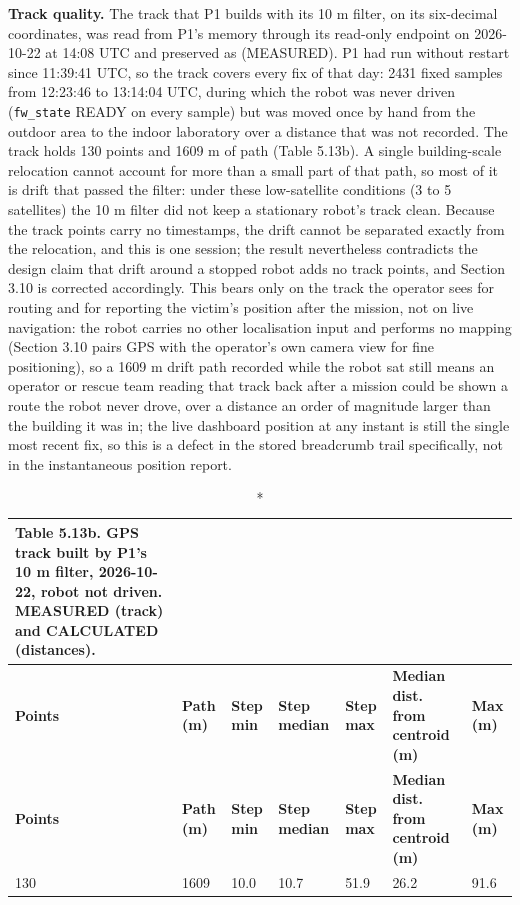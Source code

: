 \textbf{Track quality.} The track that P1 builds with its 10 m filter, on its six-decimal coordinates, was read from P1's memory through its read-only \texttt{} endpoint on 2026-10-22 at 14:08 UTC and preserved as \texttt{} (MEASURED). P1 had run without restart since 11:39:41 UTC, so the track covers every fix of that day: 2431 fixed samples from 12:23:46 to 13:14:04 UTC, during which the robot was never driven (\texttt{fw\_state} READY on every sample) but was moved once by hand from the outdoor area to the indoor laboratory over a distance that was not recorded. The track holds 130 points and 1609 m of path (Table 5.13b). A single building-scale relocation cannot account for more than a small part of that path, so most of it is drift that passed the filter: under these low-satellite conditions (3 to 5 satellites) the 10 m filter did not keep a stationary robot's track clean. Because the track points carry no timestamps, the drift cannot be separated exactly from the relocation, and this is one session; the result nevertheless contradicts the design claim that drift around a stopped robot adds no track points, and Section 3.10 is corrected accordingly. This bears only on the track the operator sees for routing and for reporting the victim's position after the mission, not on live navigation: the robot carries no other localisation input and performs no mapping (Section 3.10 pairs GPS with the operator's own camera view for fine positioning), so a 1609 m drift path recorded while the robot sat still means an operator or rescue team reading that track back after a mission could be shown a route the robot never drove, over a distance an order of magnitude larger than the building it was in; the live dashboard position at any instant is still the single most recent fix, so this is a defect in the stored breadcrumb trail specifically, not in the instantaneous position report.

\begin{center}
\footnotesize
\begin{longtable}{|p{1.4cm}|p{1.5cm}|p{1.5cm}|p{1.8cm}|p{1.5cm}|p{3.2cm}|p{1.3cm}|}
\caption*{Table 5.13b. GPS track built by P1's 10 m filter, 2026-10-22, robot not driven. MEASURED (track) and CALCULATED (distances).}
\addcontentsline{lot}{table}{\protect\numberline{5.13b}GPS track built by P1's 10 m filter, 2026-10-22, robot not driven. MEASURED (track) and CALCULATED (distances).}
\\
\hline
\textbf{Points} & \textbf{Path (m)} & \textbf{Step min} & \textbf{Step median} & \textbf{Step max} & \textbf{Median dist. from centroid (m)} & \textbf{Max (m)} \\
\hline
\endfirsthead
\hline
\textbf{Points} & \textbf{Path (m)} & \textbf{Step min} & \textbf{Step median} & \textbf{Step max} & \textbf{Median dist. from centroid (m)} & \textbf{Max (m)} \\
\hline
\endhead
130 & 1609 & 10.0 & 10.7 & 51.9 & 26.2 & 91.6 \\
\hline
\end{longtable}
\end{center}


